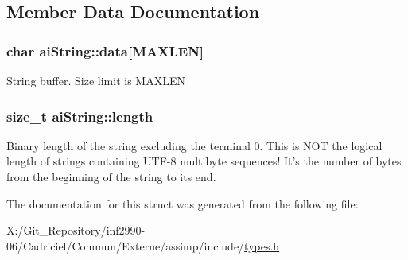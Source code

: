 \subsection{Member Data Documentation}
\hypertarget{structai_string_aa90b1da7d347a3dcca0a95061e6ea41d}{
\subsubsection[{data}]{\setlength{\rightskip}{0pt plus 5cm}char ai\-String\-::data\mbox{[}{\bf M\-A\-X\-L\-E\-N}\mbox{]}}}\label{structai_string_aa90b1da7d347a3dcca0a95061e6ea41d}
String buffer. Size limit is M\-A\-X\-L\-E\-N \hypertarget{structai_string_a7d77c2031ff0340746aa046f7fbcf313}{
\subsubsection[{length}]{\setlength{\rightskip}{0pt plus 5cm}size\-\_\-t ai\-String\-::length}}\label{structai_string_a7d77c2031ff0340746aa046f7fbcf313}
Binary length of the string excluding the terminal 0. This is N\-O\-T the logical length of strings containing U\-T\-F-\/8 multibyte sequences! It's the number of bytes from the beginning of the string to its end. 

The documentation for this struct was generated from the following file\-:\begin{DoxyCompactItemize}
\item 
X\-:/\-Git\-\_\-\-Repository/inf2990-\/06/\-Cadriciel/\-Commun/\-Externe/assimp/include/\hyperlink{types_8h}{types.\-h}\end{DoxyCompactItemize}
